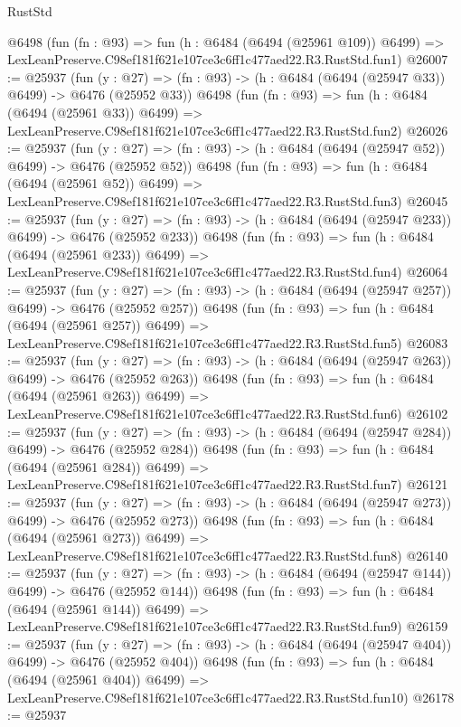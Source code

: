 \begin{lexlean}{RustStd}
\begin{coremodule}
    @6498
    (fun (fn : @93) =>
    fun (h : @6484 (@6494 (@25961 @109)) @6499) =>
    LexLeanPreserve.C98ef181f621e107ce3c6ff1c477aed22.R3.RustStd.fun1)
@26007 := @25937
    (fun (y : @27) => (fn : @93) -> (h : @6484 (@6494 (@25947 @33)) @6499) -> @6476 (@25952 @33))
    @6498
    (fun (fn : @93) =>
    fun (h : @6484 (@6494 (@25961 @33)) @6499) =>
    LexLeanPreserve.C98ef181f621e107ce3c6ff1c477aed22.R3.RustStd.fun2)
@26026 := @25937
    (fun (y : @27) => (fn : @93) -> (h : @6484 (@6494 (@25947 @52)) @6499) -> @6476 (@25952 @52))
    @6498
    (fun (fn : @93) =>
    fun (h : @6484 (@6494 (@25961 @52)) @6499) =>
    LexLeanPreserve.C98ef181f621e107ce3c6ff1c477aed22.R3.RustStd.fun3)
@26045 := @25937
    (fun (y : @27) => (fn : @93) -> (h : @6484 (@6494 (@25947 @233)) @6499) -> @6476 (@25952 @233))
    @6498
    (fun (fn : @93) =>
    fun (h : @6484 (@6494 (@25961 @233)) @6499) =>
    LexLeanPreserve.C98ef181f621e107ce3c6ff1c477aed22.R3.RustStd.fun4)
@26064 := @25937
    (fun (y : @27) => (fn : @93) -> (h : @6484 (@6494 (@25947 @257)) @6499) -> @6476 (@25952 @257))
    @6498
    (fun (fn : @93) =>
    fun (h : @6484 (@6494 (@25961 @257)) @6499) =>
    LexLeanPreserve.C98ef181f621e107ce3c6ff1c477aed22.R3.RustStd.fun5)
@26083 := @25937
    (fun (y : @27) => (fn : @93) -> (h : @6484 (@6494 (@25947 @263)) @6499) -> @6476 (@25952 @263))
    @6498
    (fun (fn : @93) =>
    fun (h : @6484 (@6494 (@25961 @263)) @6499) =>
    LexLeanPreserve.C98ef181f621e107ce3c6ff1c477aed22.R3.RustStd.fun6)
@26102 := @25937
    (fun (y : @27) => (fn : @93) -> (h : @6484 (@6494 (@25947 @284)) @6499) -> @6476 (@25952 @284))
    @6498
    (fun (fn : @93) =>
    fun (h : @6484 (@6494 (@25961 @284)) @6499) =>
    LexLeanPreserve.C98ef181f621e107ce3c6ff1c477aed22.R3.RustStd.fun7)
@26121 := @25937
    (fun (y : @27) => (fn : @93) -> (h : @6484 (@6494 (@25947 @273)) @6499) -> @6476 (@25952 @273))
    @6498
    (fun (fn : @93) =>
    fun (h : @6484 (@6494 (@25961 @273)) @6499) =>
    LexLeanPreserve.C98ef181f621e107ce3c6ff1c477aed22.R3.RustStd.fun8)
@26140 := @25937
    (fun (y : @27) => (fn : @93) -> (h : @6484 (@6494 (@25947 @144)) @6499) -> @6476 (@25952 @144))
    @6498
    (fun (fn : @93) =>
    fun (h : @6484 (@6494 (@25961 @144)) @6499) =>
    LexLeanPreserve.C98ef181f621e107ce3c6ff1c477aed22.R3.RustStd.fun9)
@26159 := @25937
    (fun (y : @27) => (fn : @93) -> (h : @6484 (@6494 (@25947 @404)) @6499) -> @6476 (@25952 @404))
    @6498
    (fun (fn : @93) =>
    fun (h : @6484 (@6494 (@25961 @404)) @6499) =>
    LexLeanPreserve.C98ef181f621e107ce3c6ff1c477aed22.R3.RustStd.fun10)
@26178 := @25937

\end{coremodule}
\end{lexlean}
